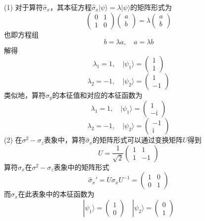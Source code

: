 \begin{solution}
    (1) 对于算符$\hat{\sigma}_x$，其本征方程$\hat{\sigma}_x|\psi\rangle = \lambda|\psi\rangle$的矩阵形式为
    $$
        \begin{pmatrix}
            0 & 1 \\
            1 & 0
        \end{pmatrix}\begin{pmatrix}
            a \\
            b
        \end{pmatrix}
        =\lambda\begin{pmatrix}
            a \\
            b
        \end{pmatrix}
    $$
    也即方程组
    $$
        b = \lambda a, \quad
        a =\lambda b
    $$
    解得
    $$
        \lambda_1=1, \quad |\psi_1\rangle=\begin{pmatrix}
            1 \\ 1
        \end{pmatrix}
    $$
    $$
        \lambda_2=-1, \quad |\psi_2\rangle=\begin{pmatrix}
            1 \\ -1
        \end{pmatrix}
    $$
    类似地，算符$\hat{\sigma}_y$的本征值和对应的本征函数为
    $$
        \lambda_1=1, \quad |\psi_1\rangle=\begin{pmatrix}
            1 \\ -\mathrm{i}
        \end{pmatrix}
    $$
    $$
        \lambda_2=-1, \quad |\psi_2\rangle=\begin{pmatrix}
            -1 \\ \mathrm{i}
        \end{pmatrix}
    $$
    (2) 在$\sigma^2-\sigma_z$表象中，算符$\hat{\sigma}_x$的矩阵形式可以通过变换矩阵$U$得到
    $$
        U=\frac{1}{\sqrt{2}}\begin{pmatrix}
            1 & 1  \\
            1 & -1
        \end{pmatrix}
    $$
    算符$\hat{\sigma}_x$在$\sigma^2-\sigma_z$表象中的矩阵形式
    $$
        \hat{\sigma}_x' = U\sigma_xU^{-1} = \begin{pmatrix}
            1 & 0 \\
            0 & 1
        \end{pmatrix}
    $$
    而$\hat{\sigma}_x$在此表象中的本征函数为
    $$
        |\psi_1\rangle=\begin{pmatrix}
            1 \\
            0
        \end{pmatrix}
        \quad
        |\psi_2\rangle=\begin{pmatrix}
            0 \\
            1
        \end{pmatrix}
    $$
\end{solution}




